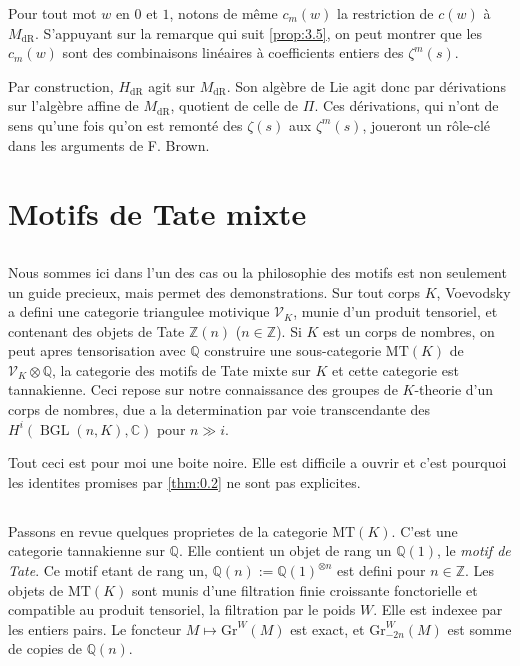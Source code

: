 \documentclass[11pt,a4paper]{article}
\theoremstyle{plain}
\theoremstyle{definition}
\DeclareMathOperator{\BGL}{BGL}
\newcommand{\Z}{\mathbb{Z}}
\newcommand{\Q}{\mathbb{Q}}
\newcommand{\C}{\mathbb{C}}
\newcommand{\dR}{\mathrm{dR}}
\newcommand{\Gr}{\mathrm{Gr}}
\newcommand{\MT}{\mathrm{MT}}
\begin{document}
Pour tout mot $w$ en $0$ et $1$, notons de m\^eme $c_m(w)$ la restriction de $c(w)$ \`a $M_{\dR}$. S'appuyant sur la remarque qui suit \ref{prop:3.5}, on peut montrer que les $c_m(w)$ sont des combinaisons lin\'eaires \`a coefficients entiers des $\zeta^m(s)$.

Par construction, $H_{\dR}$ agit sur $M_{\dR}$. Son alg\`ebre de Lie agit donc par d\'erivations sur l'alg\`ebre affine de $M_{\dR}$, quotient de celle de $\Pi$. Ces d\'erivations, qui n'ont de sens qu'une fois qu'on est remont\'e des $\zeta(s)$ aux $\zeta^m(s)$, joueront un r\^ole-cl\'e dans les arguments de F. Brown.

\section{Motifs de Tate mixte}\label{sec:5}

\subsection{}\label{ssec:5.1}

Nous sommes ici dans l'un des cas ou la philosophie des motifs est non seulement un guide precieux, mais permet des demonstrations. Sur tout corps $K$, Voevodsky a defini une categorie triangulee motivique $\mathcal{V}_K$, munie d'un produit tensoriel, et contenant des objets de Tate $\Z(n)$ ($n \in \Z$). Si $K$ est un corps de nombres, on peut apres tensorisation avec $\Q$ construire une sous-categorie $\MT(K)$ de $\mathcal{V}_K \otimes \Q$, la categorie des motifs de Tate mixte sur $K$ et cette categorie est tannakienne. Ceci repose sur notre connaissance des groupes de $K$-theorie d'un corps de nombres, due a la determination par voie transcendante des $H^i(\BGL(n,K),\C)$ pour $n \gg i$.

Tout ceci est pour moi une boite noire. Elle est difficile a ouvrir et c'est pourquoi les identites promises par \ref{thm:0.2} ne sont pas explicites.

\subsection{}\label{ssec:5.2}

Passons en revue quelques proprietes de la categorie $\MT(K)$. C'est une categorie tannakienne sur $\Q$. Elle contient un objet de rang un $\Q(1)$, le \emph{motif de Tate}. Ce motif etant de rang un, $\Q(n) := \Q(1)^{\otimes n}$ est defini pour $n \in \Z$. Les objets de $\MT(K)$ sont munis d'une filtration finie croissante fonctorielle et compatible au produit tensoriel, la filtration par le poids $W$. Elle est indexee par les entiers pairs. Le foncteur $M \mapsto \Gr^W(M)$ est exact, et $\Gr^W_{-2n}(M)$ est somme de copies de $\Q(n)$.
\end{document}
